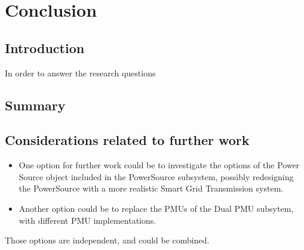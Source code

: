 \chapter{Conclusion}


\section{Introduction}
In order to answer the research questions
\section{Summary}

\section{Considerations related to further work}
\begin{itemize}
    \item One option for further work could be to investigate the options of the Power Source object included in the PowerSource subsystem, possibly redesigning the PowerSource with a more realistic Smart Grid Transmission system.
\item Another option could be to replace the PMUs of the Dual PMU subsytem, with different PMU implementations.
\end{itemize}


Those options are independent, and could be combined.

